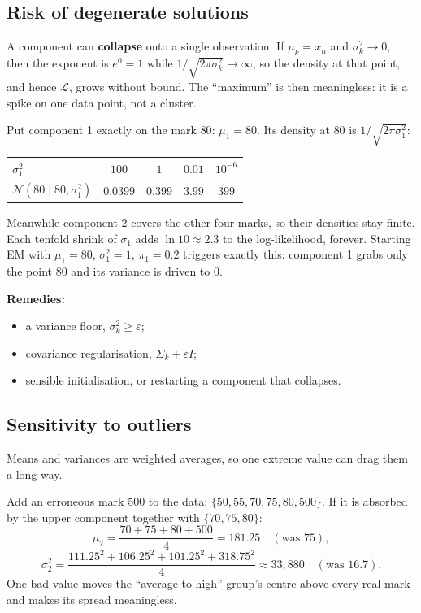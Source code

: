 \documentclass[11pt,a4paper]{article}
\newcommand{\N}{\mathcal{N}}
\newcommand{\LL}{\mathcal{L}}
\begin{document}
\subsection{Risk of degenerate solutions}\label{sec:degenerate}

A component can \textbf{collapse} onto a single observation. If $\mu_k=x_n$ and $\sigma_k^2\to0$, then the exponent is $e^0=1$ while $1/\sqrt{2\pi\sigma_k^2}\to\infty$, so the density at that point, and hence $\LL$, grows without bound. The ``maximum'' is then meaningless: it is a spike on one data point, not a cluster.

\begin{example}
Put component 1 exactly on the mark $80$: $\mu_1=80$. Its density at $80$ is $1/\sqrt{2\pi\sigma_1^2}$:
\begin{center}
\begin{tabular}{@{}lcccc@{}}
\toprule
$\sigma_1^2$ & $100$ & $1$ & $0.01$ & $10^{-6}$\\
\midrule
$\N(80\mid80,\sigma_1^2)$ & $0.0399$ & $0.399$ & $3.99$ & $399$\\
\bottomrule
\end{tabular}
\end{center}
Meanwhile component 2 covers the other four marks, so their densities stay finite. Each tenfold shrink of $\sigma_1$ adds $\ln10\approx2.3$ to the log-likelihood, forever. Starting EM with $\mu_1=80$, $\sigma_1^2=1$, $\pi_1=0.2$ triggers exactly this: component 1 grabs only the point $80$ and its variance is driven to $0$.
\end{example}

\textbf{Remedies:}
\begin{itemize}[nosep]
\item a variance floor, $\sigma_k^2\ge\varepsilon$;
\item covariance regularisation, $\Sigma_k+\varepsilon I$;
\item sensible initialisation, or restarting a component that collapses.
\end{itemize}

\subsection{Sensitivity to outliers}

Means and variances are weighted averages, so one extreme value can drag them a long way.

\begin{example}
Add an erroneous mark $500$ to the data: $\{50,55,70,75,80,500\}$. If it is absorbed by the upper component together with $\{70,75,80\}$:
\[
\mu_2=\frac{70+75+80+500}{4}=181.25\quad(\text{was }75),
\]
\[
\sigma_2^2=\frac{111.25^2+106.25^2+101.25^2+318.75^2}{4}\approx33{,}880\quad(\text{was }16.7).
\]
One bad value moves the ``average-to-high'' group's centre above every real mark and makes its spread meaningless.
\end{example}
\end{document}
